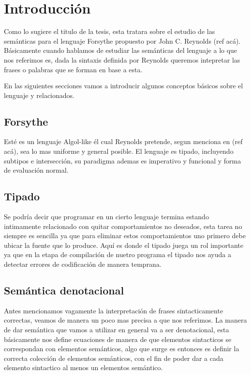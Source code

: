 \chapter{Introducci\'on}
\label{chap:intro}

Como lo sugiere el titulo de la tesis, esta tratara sobre el estudio
de las sem\'anticas para el lenguaje Forsythe propuesto por John C. Reynolds
(ref ac\'a). B\'asicamente cuando hablamos de estudiar las sem\'anticas del 
lenguaje a lo que nos referimos es, dada la sintaxis definida por Reynolds
queremos intepretar las frases o palabras que se forman en base a esta.\

En las siguientes secciones vamos a introducir algunos conceptos b\'asicos
sobre el lenguaje y relacionados.

\section{Forsythe}
Est\'e es un lenguaje Algol-like \'el cual Reynolds pretende, segun menciona 
en (ref ac\'a), sea lo mas uniforme y general posible. El lenguaje es tipado,
incluyendo subtipos e intersección, su paradigma ademas es imperativo y 
funcional y forma de evaluaci\'on normal.

\section{Tipado}
Se podr\'ia decir que programar en un cierto lenguaje termina estando intimamente
relacionado con quitar comportamientos no deseados, esta tarea no siempre es
sencilla ya que para eliminar estos comportamientos uno primero debe ubicar la
fuente que lo produce. Aqu\'i es donde el tipado juega un rol importante ya que
en la etapa de compilaci\'on de nuetro programa el tipado nos ayuda a detectar
errores de codificaci\'on de manera temprana.

\section{Sem\'antica denotacional}
Antes mencionamos vagamente la interpretaci\'on de frases sintacticamente 
correctas, veamos de manera un poco mas precisa a que nos referimos. 
La manera de dar sem\'antica que vamos a utilizar en general va a ser 
denotacional, esta b\'asicamente nos define ecuaciones de manera de que
elementos sintacticos se correspondan con elementos sem\'anticos, algo que
surge es entonces es definir la correcta colecci\'on de elementos sem\'anticos,
con el fin de poder dar a cada elemento sintactico al menos un elementos sem\'antico.
